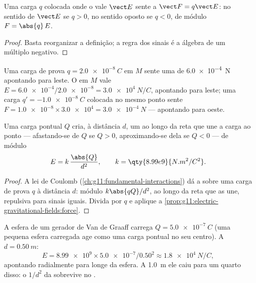 \begin{proposition}\label{prop:g11:electric-gravitational-fields:force}
Uma carga $q$ colocada onde o  vale $\vect E$ sente a 
$\vect F = q \vect E$: no sentido de $\vect E$ se $q > 0$, no sentido
oposto se $q < 0$, de módulo $F = \abs{q}\,E$.
\end{proposition}

\begin{proof}
Basta reorganizar a definição; a regra dos sinais é a álgebra de um
múltiplo negativo.
\end{proof}

\begin{example}\label{ex:g11:electric-gravitational-fields:reading}
Uma carga de prova $q = \qty{+2.0e-8}{C}$ em $M$ sente uma  de
\qty{6.0e-4}{N} apontando para leste. O  em $M$ vale
$E = \num{6.0e-4} / \num{2.0e-8} = \qty{3.0e4}{N/C}$, apontando para
leste; uma carga $q' = \qty{-1.0e-8}{C}$ colocada no mesmo ponto sente
$F = \num{1.0e-8} \times \num{3.0e4} = \qty{3.0e-4}{N}$ --- apontando
para oeste.
\end{example}

\begin{proposition}\label{prop:g11:electric-gravitational-fields:point}
Uma carga pontual $Q$ cria, à distância $d$, um  ao longo da reta
que une a carga ao ponto --- afastando-se de $Q$ se $Q > 0$,
aproximando-se dela se $Q < 0$ --- de módulo
\[
E = k\,\frac{\abs{Q}}{d^2},
\qquad k = \qty{8.99e9}{N.m^2/C^2}.
\]
\end{proposition}

\begin{proof}
A lei de Coulomb (\cref{ch:g11:fundamental-interactions}) dá a 
sobre uma carga de prova $q$ à distância $d$: módulo $k \abs{qQ} / d^2$,
ao longo da reta que as une, repulsiva para sinais iguais. Divida por $q$
e aplique a \cref{prop:g11:electric-gravitational-fields:force}.
\end{proof}

\begin{example}\label{ex:g11:electric-gravitational-fields:sphere}
A esfera de um gerador de Van de Graaff carrega $Q = \qty{+5.0e-7}{C}$
(uma pequena esfera carregada age como uma carga pontual no seu centro).
A $d = \qty{0.50}{m}$:
\[
E = \num{8.99e9} \times \num{5.0e-7} / 0.50^2 \approx \qty{1.8e4}{N/C},
\]
apontando radialmente para longe da esfera. A \qty{1.0}{m} ele caiu para
um quarto disso: o $1/d^2$ da  sobrevive no .
\end{example}

